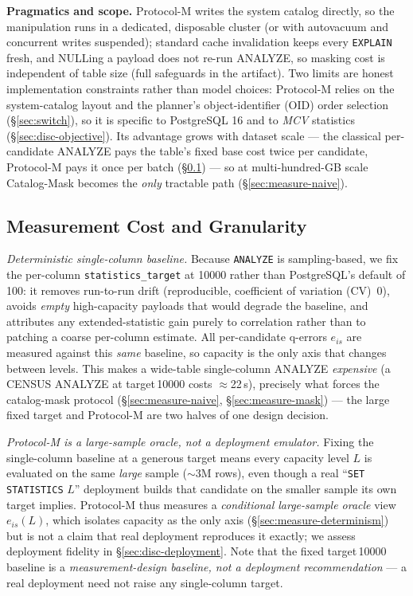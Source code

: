 \documentclass[sigconf, nonacm]{acmart}
\begin{document}
\textbf{Pragmatics and scope.} Protocol-M writes the system catalog directly,
so the manipulation runs in a dedicated, disposable cluster (or with autovacuum
and concurrent writes suspended); standard cache invalidation keeps every
\texttt{EXPLAIN} fresh, and NULLing a payload does not re-run ANALYZE, so
masking cost is independent of table size (full safeguards in the artifact).
Two limits are honest implementation constraints rather than model choices:
Protocol-M relies on the system-catalog layout and the planner's
object-identifier (OID) order
selection (\S\ref{sec:switch}), so it is specific to PostgreSQL 16 and to
\emph{MCV} statistics (\S\ref{sec:disc-objective}). Its advantage grows with
dataset scale --- the classical per-candidate ANALYZE pays the table's fixed
base cost twice per candidate, Protocol-M pays it once per batch
(\S\ref{sec:measure-runtime}) --- so at multi-hundred-GB scale Catalog-Mask
becomes the \emph{only} tractable path (\S\ref{sec:measure-naive}).

\subsection{Measurement Cost and Granularity}
\label{sec:measure-runtime}

\emph{Deterministic single-column baseline.}\label{sec:measure-determinism}
Because \texttt{ANALYZE} is sampling-based, we fix the per-column
\texttt{statistics\_target} at 10000 rather than PostgreSQL's default of 100:
it removes run-to-run drift (reproducible, coefficient of variation
(CV)~$0$), avoids \emph{empty}
high-capacity payloads that would degrade the baseline, and attributes any
extended-statistic gain purely to correlation rather than to patching a coarse
per-column estimate. All per-candidate q-errors $e_{is}$ are measured against
this \emph{same} baseline, so capacity is the only axis that changes between
levels. This makes a wide-table single-column ANALYZE \emph{expensive} (a CENSUS
ANALYZE at target\,10000 costs $\approx$22\,s), precisely what forces the
catalog-mask protocol (\S\ref{sec:measure-naive}, \S\ref{sec:measure-mask}) ---
the large fixed target and Protocol-M are two halves of one design decision.

\emph{Protocol-M is a large-sample oracle, not a deployment emulator.}
Fixing the single-column baseline at a generous target means every capacity
level $L$ is evaluated on the same \emph{large} sample ($\sim$3M rows), even
though a real ``\texttt{SET STATISTICS} $L$'' deployment builds that candidate
on the smaller sample its own target implies. Protocol-M thus measures a
\emph{conditional large-sample oracle} view $e_{is}(L)$, which isolates capacity
as the only axis (\S\ref{sec:measure-determinism}) but is not a claim that real
deployment reproduces it exactly; we assess deployment fidelity in
\S\ref{sec:disc-deployment}. Note that the fixed target\,10000 baseline is a
\emph{measurement-design baseline, not a deployment recommendation} --- a
real deployment need not raise any single-column target.
\end{document}
